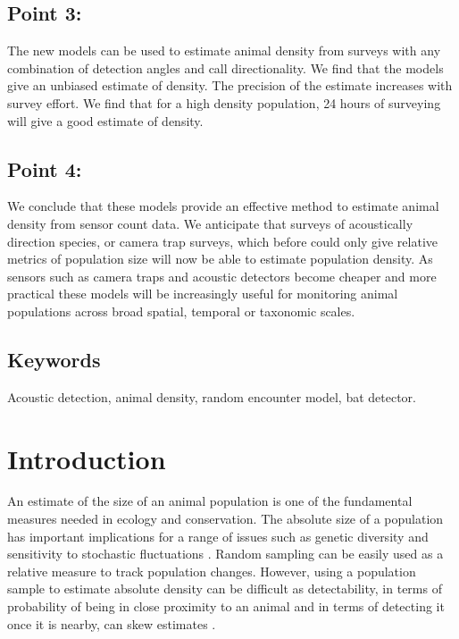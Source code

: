 \documentclass[a4paper,10pt,reqno,oneside]{amsart}
\begin{document}
\subsection*{Point 3:} The new models can be used to estimate animal density from surveys with any combination of detection angles and call directionality. We find that the models give an unbiased estimate of density. The precision of the estimate increases with survey effort. We find that for a high density population, 24 hours of surveying will give a good estimate of density. %

\subsection*{Point 4:} We conclude that these models provide an effective method to estimate animal density from sensor count data. We anticipate that surveys of acoustically direction species, or camera trap surveys, which before could only give relative metrics of population size will now be able to estimate population density.   As sensors such as camera traps and acoustic detectors become cheaper and more practical these models will be increasingly useful for monitoring animal populations across broad spatial, temporal or taxonomic scales.

\subsection{Keywords}
Acoustic detection, animal density, random encounter model, bat detector.

\section{Introduction}

An estimate of the size of an animal population is one of the fundamental measures needed in ecology and conservation. The absolute size of a population has important implications for a range of issues such as genetic diversity \citep{o1985genetic, fischer2000genetic, willi2005threefold} and sensitivity to stochastic fluctuations \citep{wright1983stochastic, richter1972extinction}. Random sampling can be easily used as a relative measure to track population changes. However, using a population sample to estimate absolute density can be difficult as detectability, in terms of probability of being in close proximity to an animal and in terms of detecting it once it is nearby, can skew estimates \citep{jennelle2002use, foster2012critique}.
\end{document}
